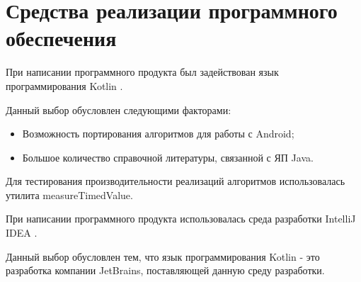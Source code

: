 \documentclass[12pt]{report}
\begin{document}
\section{Средства реализации программного обеспечения}
При написании программного продукта был задействован язык программирования Kotlin \cite{Kotlin}.

Данный выбор обусловлен следующими факторами:
\begin{itemize}
\item Возможность портирования алгоритмов для работы с Android;
\item Большое количество справочной литературы, связанной с ЯП Java.
\end{itemize}

Для тестирования производительности реализаций алгоритмов использовалась утилита measureTimedValue.

При написании программного продукта использовалась среда разработки IntelliJ IDEA \cite{IntelliJ}.

Данный выбор обусловлен тем, что язык программирования Kotlin - это разработка компании JetBrains, поставляющей данную среду разработки.
\end{document}
